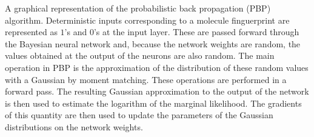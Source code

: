 A graphical representation of the probabilistic back propagation (PBP)
algorithm. Deterministic inputs 
corresponding to a molecule finguerprint are represented as $1$'s and $0$'s at the input
layer. These are passed forward through the Bayesian neural network and, because
the network weights are random, the values obtained at the output of the
neurons are also random. The main operation in PBP is the approximation of the
distribution of these random values with a Gaussian by moment matching. These
operations are performed in a forward pass. The resulting Gaussian
approximation to the output of the network is then used to estimate the
logarithm of the marginal likelihood. The gradients of this quantity are then
used to update the parameters of the Gaussian distributions on the network
weights.
